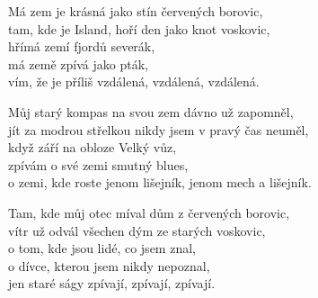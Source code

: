 
\ve{}
Má zem je krásná jako stín červených borovic,\\
tam, kde je Island, hoří den jako knot voskovic,\\
hřímá zemí fjordů severák,\\
má země zpívá jako pták, \\
vím, že je příliš vzdálená, vzdálená, vzdálená. 

\ve{}
Můj starý kompas na svou zem dávno už zapomněl,\\
jít za modrou střelkou nikdy jsem v pravý čas neuměl,\\
když září na obloze Velký vůz,\\
zpívám o své zemi smutný blues,\\
o zemi, kde roste jenom lišejník, jenom mech a lišejník.

\ve{}
Tam, kde můj otec míval dům z červených borovic,\\
vítr už odvál všechen dým ze starých voskovic,\\
o tom, kde jsou lidé, co jsem znal,\\
o dívce, kterou jsem nikdy nepoznal,\\
jen staré ságy zpívají, zpívají, zpívají.

\esong